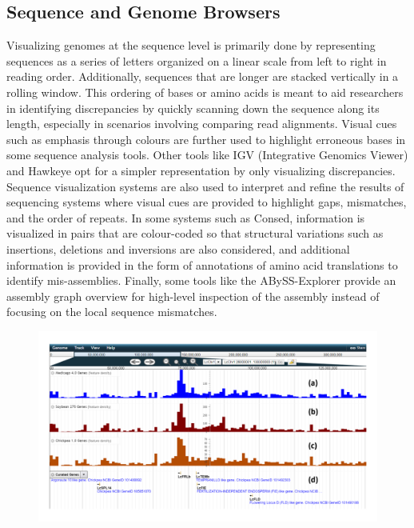 \subsection{Sequence and Genome Browsers}
Visualizing genomes at the sequence level is primarily done by representing sequences
as a series of letters organized on a linear scale from left to right in reading order. Additionally, sequences that are longer are stacked vertically in a rolling window. This ordering of bases or amino acids is meant to aid researchers in identifying discrepancies by quickly scanning down the sequence along its length, especially in scenarios involving comparing read alignments. Visual cues such as emphasis through colours are further used to highlight erroneous bases in some sequence analysis tools\cite{consed,ewing1998base}. Other tools like IGV (Integrative Genomics Viewer)\cite{thorvaldsdottir2013integrative} and Hawkeye\cite{schatz2007hawkeye} opt for a simpler representation by only visualizing discrepancies. Sequence visualization systems are also used to interpret and refine the results of sequencing systems where visual cues are provided to highlight gaps, mismatches, and the order of repeats\cite{bonfield1995new,consed}. In some systems such as Consed\cite{consed}, information is visualized in pairs that are colour-coded so that structural variations such as insertions, deletions and inversions are also considered, and additional information is provided in the form of annotations of amino acid translations to identify mis-assemblies. Finally, some tools like the ABySS-Explorer provide an assembly graph overview for high-level inspection of the assembly instead of focusing on the local sequence mismatches\cite{nielsen2009abyss}. 


\begin{figure}
  \centering
  \includegraphics[width=1\linewidth]{images/ch_2_jbrowse.PNG}
  \label{fig:ch_2_jbrowse}
\end{figure}


